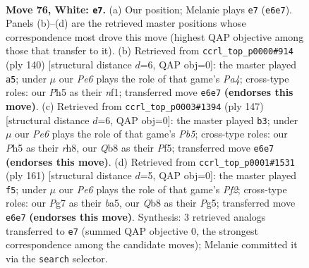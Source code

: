 \documentclass[11pt]{article}
\begin{document}
\clearpage

\begin{figure}[p]\centering
\begin{subfigure}{0.46\textwidth}\centering
\resizebox{\linewidth}{!}{%
\newchessgame
\chessboard[
  setfen={1Q6/6P1/4P3/k6P/8/8/4K3/8 w - - 9 76},
  showmover=false,
  pgfstyle=straightmove, color=movearrow, markmove={e6-e7}
]}
\caption{}
\end{subfigure}\hfill
\begin{subfigure}{0.46\textwidth}\centering
\resizebox{\linewidth}{!}{%
\newchessgame
\chessboard[
  setfen={7Q/k7/8/6K1/P7/8/8/5n2 w - - 1 71},
  showmover=false,
  pgfstyle=straightmove, color=movearrow, markmove={a4-a5}
]}
\caption{}
\end{subfigure}
\\[4pt]
\begin{subfigure}{0.46\textwidth}\centering
\resizebox{\linewidth}{!}{%
\newchessgame
\chessboard[
  setfen={7R/3k4/8/5p2/1p6/3K4/8/8 b - - 0 74},
  showmover=false,
  pgfstyle=straightmove, color=movearrow, markmove={b4-b3}
]}
\caption{}
\end{subfigure}\hfill
\begin{subfigure}{0.46\textwidth}\centering
\resizebox{\linewidth}{!}{%
\newchessgame
\chessboard[
  setfen={8/5p2/8/B2k2p1/6P1/8/8/K7 b - - 5 81},
  showmover=false,
  pgfstyle=straightmove, color=movearrow, markmove={f7-f5}
]}
\caption{}
\end{subfigure}
\caption{\textbf{Move 76, White: \texttt{e7}.} (a) Our position; Melanie plays \texttt{e7} (\texttt{e6e7}). Panels (b)--(d) are the retrieved master positions whose correspondence most drove this move (highest QAP objective among those that transfer to it). (b) Retrieved from \texttt{ccrl\_top\_p0000\#914} (ply 140) [structural distance $d$=6, QAP obj=0]: the master played \texttt{a5}; under $\mu$ our \emph{Pe6} plays the role of that game's \emph{Pa4}; cross-type roles: our \emph{P}h5 as their \emph{n}f1; transferred move \texttt{e6e7} \textbf{(endorses this move)}. (c) Retrieved from \texttt{ccrl\_top\_p0003\#1394} (ply 147) [structural distance $d$=6, QAP obj=0]: the master played \texttt{b3}; under $\mu$ our \emph{Pe6} plays the role of that game's \emph{Pb5}; cross-type roles: our \emph{P}h5 as their \emph{r}h8, our \emph{Q}b8 as their \emph{P}f5; transferred move \texttt{e6e7} \textbf{(endorses this move)}. (d) Retrieved from \texttt{ccrl\_top\_p0001\#1531} (ply 161) [structural distance $d$=5, QAP obj=0]: the master played \texttt{f5}; under $\mu$ our \emph{Pe6} plays the role of that game's \emph{Pf2}; cross-type roles: our \emph{P}g7 as their \emph{b}a5, our \emph{Q}b8 as their \emph{P}g5; transferred move \texttt{e6e7} \textbf{(endorses this move)}. Synthesis: 3 retrieved analogs transferred to \texttt{e7} (summed QAP objective 0, the strongest correspondence among the candidate moves); Melanie committed it via the \texttt{search} selector.}
\label{fig:thought-m150}
\end{figure}
\end{document}
